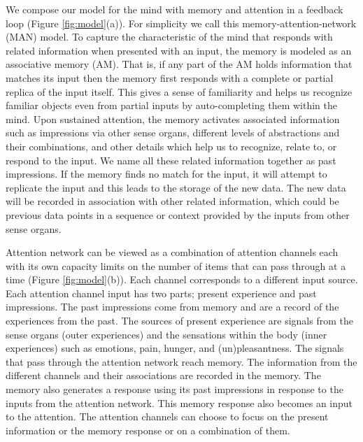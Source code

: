 \documentclass[reprint,amsmath,amssymb,apr,aip,onecolumn, 11pt]{revtex4-1}
\begin{document}
	
		We compose our model for the mind with memory and attention in a feedback loop (Figure \ref{fig:model}(a)). For simplicity we call this memory-attention-network (MAN) model. To capture the characteristic of the mind that responds with related information when presented with an input, the memory is modeled as an associative memory (AM). That is, if any part of the AM holds information that matches its input then the memory first responds with a complete or partial replica of the input itself. This gives a sense of familiarity and helps us recognize familiar objects even from partial inputs by auto-completing them within the mind. Upon sustained attention, the memory activates associated information such as impressions via other sense organs, different levels of abstractions and their combinations, and other details which help us to recognize, relate to, or respond to the input. We name all these related information together as past impressions. If the memory finds no match for the input, it will attempt to replicate the input and this leads to the storage of the new data. The new data will be recorded in association with other related information, which could be previous data points in a sequence or context provided by the inputs from other sense organs. 
%		
		
		 Attention network can be viewed as a combination of attention channels each with its own capacity limits on the number of items that can pass through at a time (Figure \ref{fig:model}(b)). Each channel corresponds to a different input source. Each attention channel input has two parts; present experience and past impressions. The past impressions come from memory and are a record of the experiences from the past. The sources of present experience are signals from the sense organs (outer experiences) and the sensations within the body (inner experiences) such as emotions,  pain, hunger, and (un)pleasantness. The signals that pass through the attention network reach memory. The information from the different channels and their associations are recorded in the memory. The memory also generates a response using its past impressions in response to the inputs from the attention network. This memory response also becomes an input to the attention. The attention channels can choose to focus on the present information or the memory response or on a combination of them. 
		 
\end{document}
